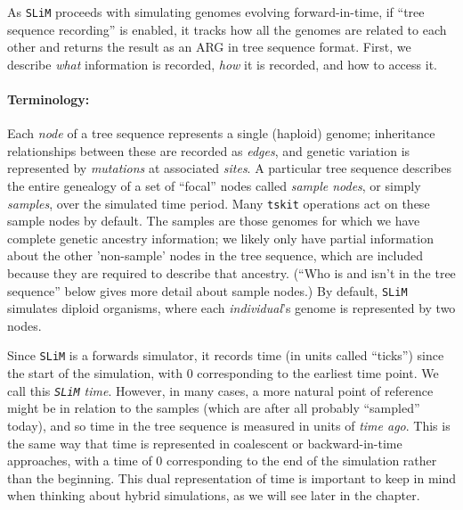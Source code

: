 \documentclass[12pt]{article}
\newcommand{\tskit}[0]{\texttt{tskit}\xspace}
\newcommand{\slim}[0]{\texttt{SLiM}\xspace}
\begin{document}
As \slim proceeds with simulating genomes evolving forward-in-time, 
if ``tree sequence recording'' is enabled,
it tracks how all the genomes are
related to each other and returns the result as an ARG in tree sequence format. First, we describe
\emph{what} information is recorded, \emph{how} it is recorded, and how to access it.

\paragraph{Terminology:}
Each \textit{node} of a tree sequence represents a single (haploid) genome;
inheritance relationships between these are recorded as \textit{edges},
and genetic variation is represented by \textit{mutations} at associated \textit{sites}.
A particular tree sequence describes the entire genealogy of a set of ``focal'' nodes called
\textit{sample nodes}, or simply \textit{samples}, over the simulated time period.
Many \tskit operations act on these sample nodes by default.
The samples are those genomes for which we have complete genetic ancestry information; 
we likely only have partial information about the other 'non-sample' nodes in the tree sequence,
which are included because they are required to describe that ancestry.
(``Who is and isn't in the tree sequence'' below gives more detail about sample nodes.)
By default, \slim simulates diploid organisms, where each \textit{individual}'s genome is represented by two nodes.

Since \slim is a forwards simulator, it records time (in units called ``ticks'')
since the start of the simulation, with 0 corresponding to the earliest time point.
We call this \textit{\slim time}.
However, in many cases, a more natural point of reference might be in relation to the samples
(which are after all probably ``sampled'' today),
and so time in the tree sequence is measured in units of \textit{time ago}.
This is the same way that time
is represented in coalescent or backward-in-time approaches, with a time of 0 corresponding
to the end of the simulation rather than the beginning.
This dual representation of time is important
to keep in mind when thinking about hybrid simulations, as we will see later in the chapter.
\end{document}
